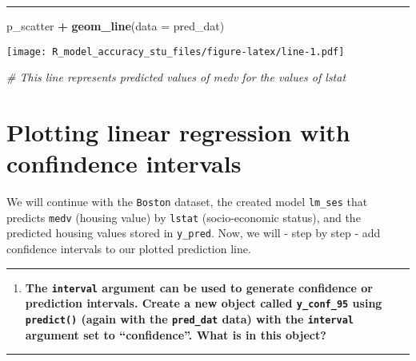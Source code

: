 \documentclass[
  12pt,
]{article}
\newenvironment{Shaded}{\begin{snugshade}}{\end{snugshade}}
\newcommand{\AttributeTok}[1]{\textcolor[rgb]{0.13,0.29,0.53}{#1}}
\newcommand{\CommentTok}[1]{\textcolor[rgb]{0.56,0.35,0.01}{\textit{#1}}}
\newcommand{\FunctionTok}[1]{\textcolor[rgb]{0.13,0.29,0.53}{\textbf{#1}}}
\newcommand{\NormalTok}[1]{#1}
\newcommand{\SpecialCharTok}[1]{\textcolor[rgb]{0.81,0.36,0.00}{\textbf{#1}}}
\providecommand{\tightlist}{%
  \setlength{\itemsep}{0pt}\setlength{\parskip}{0pt}}
\begin{document}
\begin{center}\rule{0.5\linewidth}{0.5pt}\end{center}

\begin{Shaded}
\begin{Highlighting}[]
\NormalTok{p\_scatter }\SpecialCharTok{+} \FunctionTok{geom\_line}\NormalTok{(}\AttributeTok{data =}\NormalTok{ pred\_dat)}
\end{Highlighting}
\end{Shaded}

\texttt{[image: R\_model\_accuracy\_stu\_files/figure-latex/line-1.pdf]}

\begin{Shaded}
\begin{Highlighting}[]
\CommentTok{\# This line represents predicted values of medv for the values of lstat }
\end{Highlighting}
\end{Shaded}

\hypertarget{plotting-linear-regression-with-confindence-intervals}{%
\section{Plotting linear regression with confindence
intervals}\label{plotting-linear-regression-with-confindence-intervals}}

We will continue with the \texttt{Boston} dataset, the created model
\texttt{lm\_ses} that predicts \texttt{medv} (housing value) by
\texttt{lstat} (socio-economic status), and the predicted housing values
stored in \texttt{y\_pred}. Now, we will - step by step - add confidence
intervals to our plotted prediction line.

\begin{center}\rule{0.5\linewidth}{0.5pt}\end{center}

\begin{enumerate}
\def\labelenumi{\arabic{enumi}.}
\setcounter{enumi}{4}
\tightlist
\item
  \textbf{The \texttt{interval} argument can be used to generate
  confidence or prediction intervals. Create a new object called
  \texttt{y\_conf\_95} using \texttt{predict()} (again with the
  \texttt{pred\_dat} data) with the \texttt{interval} argument set to
  ``confidence''. What is in this object?}
\end{enumerate}

\begin{center}\rule{0.5\linewidth}{0.5pt}\end{center}
\end{document}

